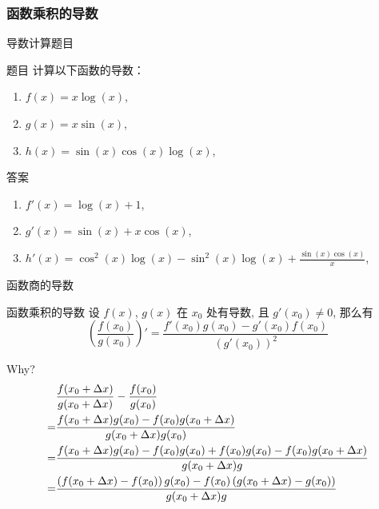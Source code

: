 \documentclass[
10pt,
aspectratio=43,
]{beamer}
\begin{document}
\begin{frame}
	\frametitle{函数乘积的导数}{导数计算题目}
	\begin{exampleblock}{题目}
		计算以下函数的导数：
		\begin{enumerate}
			\item $f(x) = x \log(x)$,
			\item $g(x) = x \sin(x)$,
			\item $h(x) = \sin(x) \cos(x) \log(x)$,
		\end{enumerate}
	\end{exampleblock}

	\pause

	\begin{exampleblock}{答案}
		\begin{enumerate}
			\item $f'(x) = \log(x) + 1$,
			\item $g'(x) = \sin(x) + x \cos(x)$,
			\item $h'(x) = \cos^2(x) \log(x) - \sin^2(x) \log(x) + \displaystyle\frac{\sin(x)\cos(x)}{x}$,
		\end{enumerate}
	\end{exampleblock}
\end{frame}

\begin{frame}{函数商的导数}
	\begin{block}{函数乘积的导数}
		设 $f(x)$, $g(x)$ 在 $x_0$ 处有导数, 且 $g'(x_0)\neq 0$, 那么有
		\[
			\left(\frac{f(x_0)}{g(x_0)}\right)' = \frac{f'(x_0)g(x_0)-g'(x_0)f(x_0)}{(g'(x_0))^2}
		\]
	\end{block}
	Why?
	\begin{align*}
		  & \frac{f(x_0+\Delta x)}{g(x_0+\Delta x)}-\frac{f(x_0)}{g(x_0)}                                                \\\bigskip
		= & \frac{f(x_0+\Delta x)g(x_0)-f(x_0)g(x_0+\Delta x)}{g(x_0+\Delta x)g(x_0)}                                    \\\bigskip
		= & \frac{f(x_0+\Delta x)g(x_0)-f(x_0)g(x_0)+f(x_0)g(x_0)-f(x_0)g(x_0+\Delta x)}{g(x_0+\Delta x)g}               \\\bigskip
		= & \frac{\left(f(x_0+\Delta x)-f(x_0)\right)g(x_0)-f(x_0)\left(g(x_0+\Delta x)-g(x_0)\right)}{g(x_0+\Delta x)g}
	\end{align*}
\end{frame}
\end{document}
